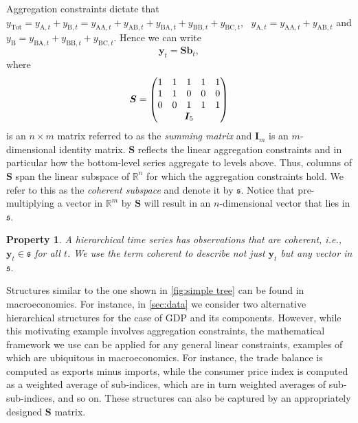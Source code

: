 \documentclass[a4paper, 11pt]{article}
\newtheorem{property}{Property}[section]
\begin{document}
Aggregation constraints dictate that $y_{\text{Tot}}=y_{\text{A},t}+y_{\text{B},t}=y_{\text{AA},t}+y_{\text{AB},t}+y_{\text{BA},t}+y_{\text{BB},t}+y_{\text{BC},t}$,~ $y_{\text{A},t}=y_{\text{AA},t}+y_{\text{AB},t}$ and $y_{\text{B}}=y_{\text{BA},t}+y_{\text{BB},t}+y_{\text{BC},t}$. Hence we can write
\begin{equation}\label{eq:summing matrix}
\bm{y}_t = \bm{Sb}_t,
\end{equation}
where \begin{equation*}
\bm{S} = \begin{pmatrix}
1 & 1                            & 1 & 1 & 1 \\
1 & 1                            & 0 & 0 & 0 \\
0 & 0                            & 1 & 1 & 1 \\
& \multicolumn{3}{c}{\bm{I}_5} &
\end{pmatrix}
\end{equation*}
is an $n\times m$ matrix referred to as the \textit{summing matrix} and $\bm{I}_m$ is an $m$-dimensional identity matrix. $\bm{S}$ reflects the linear aggregation constraints and in particular how the bottom-level series aggregate to levels above. Thus, columns of $\bm{S}$ span the linear subspace of $\mathbb{R}^n$ for which the aggregation constraints hold. We refer to this as the \textit{coherent subspace} and denote it by $\mathfrak{s}$. Notice that pre-multiplying a vector in $\mathbb{R}^m$ by $\bm{S}$ will result in an $n$-dimensional vector that lies in $\mathfrak{s}$.

\begin{property}
	A hierarchical time series has observations that are \textit{coherent}, i.e., $\bm{y}_{t} \in \mathfrak{s}$ for all $t$. We use the term coherent to describe not just $\bm{y}_t$ but any vector in $\mathfrak{s}$.
	\label{prop:coherence}
\end{property}

Structures similar to the one shown in \autoref{fig:simple tree} can be found in macroeconomics. For instance, in \autoref{sec:data} we consider two alternative hierarchical structures for the case of GDP and its components. However, while this motivating example involves aggregation constraints, the mathematical framework we use can be applied for any general linear constraints, examples of which are ubiquitous in macroeconomics. For instance, the trade balance is computed as exports minus imports, while the consumer price index is computed as a weighted average of sub-indices, which are in turn weighted averages of sub-sub-indices, and so on. These structures can also be captured by an appropriately designed $\bm{S}$ matrix.
\end{document}
